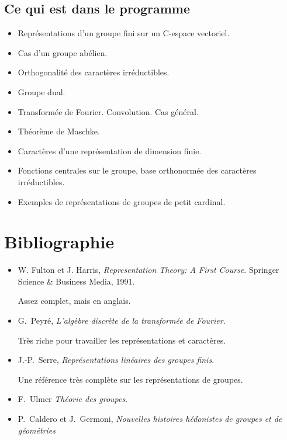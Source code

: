 \documentclass[a4paper]{article}
\theoremstyle{definition} %
\theoremstyle{plain} %
\theoremstyle{remark} %
\begin{document}
\subsection*{Ce qui est dans le programme}

\begin{itemize}
\item Représentations d’un groupe fini sur un C-espace vectoriel.
\item Cas d’un groupe abélien.
\item Orthogonalité des caractères irréductibles.
\item Groupe dual.
\item Transformée de Fourier. Convolution. Cas général.
\item Théorème de Maschke.
\item Caractères d’une représentation de dimension finie.
\item Fonctions centrales sur le groupe, base orthonormée des caractères irréductibles.
\item Exemples de représentations de groupes de petit cardinal.
\end{itemize}

\section*{Bibliographie}

\begin{itemize}
\renewcommand{\labelitemi}{$\bullet$}
\setlength\itemsep{-1em}

\item W. Fulton et J. Harris, \emph{Representation Theory: A First Course}. Springer Science \& Business Media, 1991.

	Assez complet, mais en anglais.\\

\item G.~Peyré, \emph{L'algèbre discrète de la transformée de Fourier}.

	Très riche pour travailler les représentations et caractères.\\

\item J.-P.~Serre, \emph{Représentations linéaires des groupes finis}.

	Une référence très complète sur les représentations de groupes.\\

\item F.~Ulmer \emph{Théorie des groupes}. \\

\item P.~Caldero et J.~Germoni, \emph{Nouvelles histoires hédonistes de groupes et de géométries}

\end{itemize}
\vspace{-2em}
\end{document}
